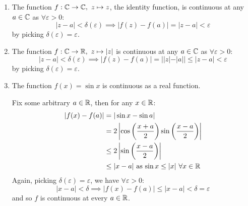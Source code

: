 \documentclass[../main.tex]{subfiles}
\begin{document}
\begin{example}
  \begin{enumerate}
    \item The function $f: \mathbb{C} \to \mathbb{C},\ z \mapsto z$, the identity function, is continuous at any $a \in \mathbb{C}$ as $\forall \varepsilon > 0$:
      \[
        |z - a| < \delta(\varepsilon) \implies |f(z) - f(a)| = |z - a| < \varepsilon
      \]
      by picking $\delta(\varepsilon) = \varepsilon$.
    \item The function $f: \mathbb{C} \to \mathbb{R},\ z \mapsto |z|$ is continuous at any $a \in \mathbb{C}$ as $\forall \varepsilon > 0$:
      \[
        |z - a| < \delta(\varepsilon) \implies |f(z) - f(a)| = ||z| - |a|| \leq |z - a| < \varepsilon
      \]
      by picking $\delta(\varepsilon) = \varepsilon$.
    \item The function $f(x) = \sin x$ is continuous as a real function.

      Fix some arbitrary $a \in \mathbb{R}$, then for any $x \in \mathbb{R}$:
      \begin{align*}
        |f(x) - f(a)| &= |\sin x - \sin a| \\
                      &= 2 \abs{\cos\left(\frac{x+a}{2}\right)\sin\left(\frac{x - a}{2}\right)} \\
                      &\leq 2 \abs{\sin\left(\frac{x - a}{2}\right)} \\
                      &\leq |x - a| \text{ as $\sin x \leq |x|\ \forall x \in \R$}
      \end{align*}
      Again, picking $\delta(\varepsilon) = \varepsilon$, we have $\forall \varepsilon > 0$:
      \[
        |x - a| < \delta \implies |f(x) - f(a)| \leq |x - a| < \delta = \varepsilon
      \]
      and so $f$ is continuous at every $a \in \mathbb{R}$.
  \end{enumerate}
\end{example}
\end{document}
